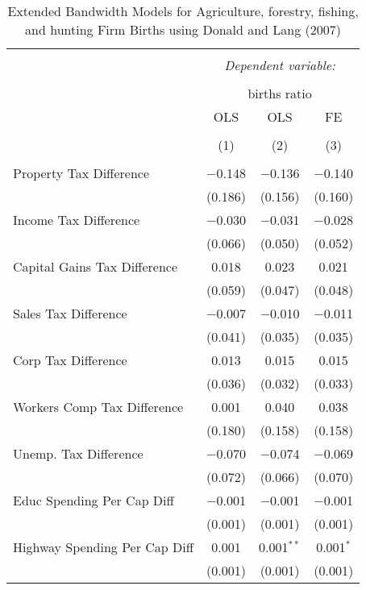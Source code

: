 
\begin{table}[!htbp] \centering 
  \caption{Extended Bandwidth Models for  Agriculture, forestry, fishing, and hunting Firm Births using Donald and Lang (2007)} 
  \label{} 
\begin{tabular}{@{\extracolsep{5pt}}lccc} 
\\[-1.8ex]\hline 
\hline \\[-1.8ex] 
 & \multicolumn{3}{c}{\textit{Dependent variable:}} \\ 
\cline{2-4} 
\\[-1.8ex] & \multicolumn{3}{c}{births ratio} \\ 
 & OLS & OLS & FE \\ 
\\[-1.8ex] & (1) & (2) & (3)\\ 
\hline \\[-1.8ex] 
 Property Tax Difference & $-$0.148 & $-$0.136 & $-$0.140 \\ 
  & (0.186) & (0.156) & (0.160) \\ 
  Income Tax Difference & $-$0.030 & $-$0.031 & $-$0.028 \\ 
  & (0.066) & (0.050) & (0.052) \\ 
  Capital Gains Tax Difference & 0.018 & 0.023 & 0.021 \\ 
  & (0.059) & (0.047) & (0.048) \\ 
  Sales Tax Difference & $-$0.007 & $-$0.010 & $-$0.011 \\ 
  & (0.041) & (0.035) & (0.035) \\ 
  Corp Tax Difference & 0.013 & 0.015 & 0.015 \\ 
  & (0.036) & (0.032) & (0.033) \\ 
  Workers Comp Tax Difference & 0.001 & 0.040 & 0.038 \\ 
  & (0.180) & (0.158) & (0.158) \\ 
  Unemp. Tax Difference & $-$0.070 & $-$0.074 & $-$0.069 \\ 
  & (0.072) & (0.066) & (0.070) \\ 
  Educ Spending Per Cap Diff & $-$0.001 & $-$0.001 & $-$0.001 \\ 
  & (0.001) & (0.001) & (0.001) \\ 
  Highway Spending Per Cap Diff & 0.001 & 0.001$^{**}$ & 0.001$^{*}$ \\ 
  & (0.001) & (0.001) & (0.001) \\ 

\end{tabular}
\end{table}
